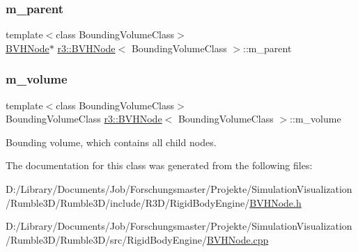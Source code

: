 \subsubsection{\texorpdfstring{m\+\_\+parent}{m\_parent}}
{\footnotesize\ttfamily template$<$class Bounding\+Volume\+Class$>$ \\
\mbox{\hyperlink{classr3_1_1_b_v_h_node}{B\+V\+H\+Node}}$\ast$ \mbox{\hyperlink{classr3_1_1_b_v_h_node}{r3\+::\+B\+V\+H\+Node}}$<$ Bounding\+Volume\+Class $>$\+::m\+\_\+parent\hspace{0.3cm}{\ttfamily [protected]}}

\mbox{\label{classr3_1_1_b_v_h_node_a114366b1f5cbb56f6f650f9c794258a7}} 
\subsubsection{\texorpdfstring{m\+\_\+volume}{m\_volume}}
{\footnotesize\ttfamily template$<$class Bounding\+Volume\+Class$>$ \\
Bounding\+Volume\+Class \mbox{\hyperlink{classr3_1_1_b_v_h_node}{r3\+::\+B\+V\+H\+Node}}$<$ Bounding\+Volume\+Class $>$\+::m\+\_\+volume\hspace{0.3cm}{\ttfamily [protected]}}



Bounding volume, which contains all child nodes. 



The documentation for this class was generated from the following files\+:\begin{DoxyCompactItemize}
\item 
D\+:/\+Library/\+Documents/\+Job/\+Forschungsmaster/\+Projekte/\+Simulation\+Visualization/\+Rumble3\+D/\+Rumble3\+D/include/\+R3\+D/\+Rigid\+Body\+Engine/\mbox{\hyperlink{_b_v_h_node_8h}{B\+V\+H\+Node.\+h}}\item 
D\+:/\+Library/\+Documents/\+Job/\+Forschungsmaster/\+Projekte/\+Simulation\+Visualization/\+Rumble3\+D/\+Rumble3\+D/src/\+Rigid\+Body\+Engine/\mbox{\hyperlink{_b_v_h_node_8cpp}{B\+V\+H\+Node.\+cpp}}\end{DoxyCompactItemize}
